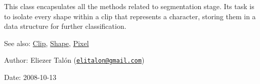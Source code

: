 This class encapsulates all the methods related to segmentation stage. Its task is to isolate every shape within a clip that represents a character, storing them in a data structure for further classification.

\begin{Desc}
\item[See also:]\hyperlink{class_clip}{Clip}, \hyperlink{class_shape}{Shape}, \hyperlink{_pixel_8hpp_535e59456e3e633842529cfa8ea103c4}{Pixel}\end{Desc}
\begin{Desc}
\item[Author:]Eliezer Talón (\href{mailto:elitalon@gmail.com}{\tt elitalon@gmail.com}) \end{Desc}
\begin{Desc}
\item[Date:]2008-10-13 \end{Desc}


